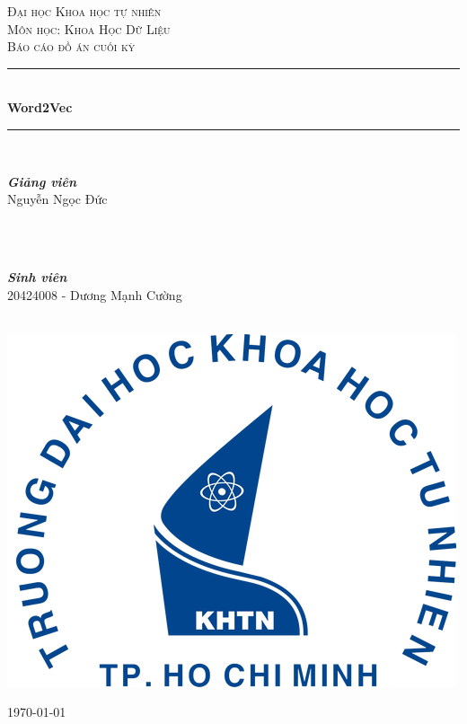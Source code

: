 \documentclass[12pt]{article}
\begin{document}
\begin{titlepage}

\newcommand{\HRule}{\rule{\linewidth}{0.5mm}} 
  
  \center
  
  \textsc{\LARGE Đại học Khoa học tự nhiên}\\[1.5cm] 
  \textsc{\Large Môn học: Khoa Học Dữ Liệu}\\[0.5cm] 
  \textsc{\large Báo cáo đồ án cuối kỳ}\\[0.5cm] 
  
  \HRule \\[0.4cm]
  { \huge \bfseries Word2Vec}\\[0.4cm]
  \HRule \\[1.5cm]

  \begin{minipage}{0.4\textwidth}
  \begin{flushleft} \large
  \emph{\textbf{Giảng viên}}\\
  Nguyễn Ngọc Đức 
  \end{flushleft}
  \end{minipage}
  ~
  \begin{minipage}{0.4\textwidth}
  \begin{flushright}
    \large \emph{\\[3cm]\textbf{Sinh viên}} \\
    20424008 - Dương Mạnh Cường
  \end{flushright}
  \end{minipage}\\[2cm]

  \includegraphics{./images/logo_hcmus.png}\\[1cm]
  \vfill

  \today
  
  \end{titlepage}
\end{document}
